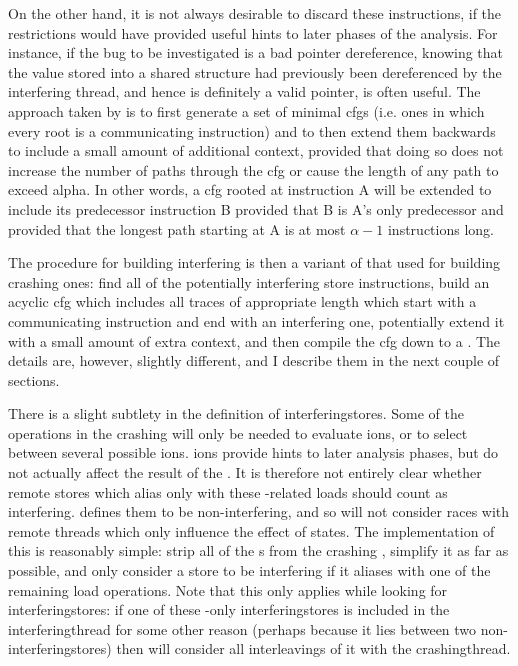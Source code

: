 On the other hand, it is not always desirable to discard these
instructions, if the restrictions would have provided useful hints to
later phases of the analysis.  For instance, if the bug to be
investigated is a bad pointer dereference, knowing that the value
stored into a shared structure had previously been dereferenced by the
interfering thread, and hence is definitely a valid pointer, is often
useful.  The approach taken by {\implementation} is to first generate
a set of minimal \glspl{cfg} (i.e. ones in which every root is a
communicating instruction) and to then extend them backwards to
include a small amount of additional context, provided that doing so
does not increase the number of paths through the \gls{cfg} or cause
the length of any path to exceed \gls{alpha}.  In other words, a
\gls{cfg} rooted at instruction A will be extended to include its
predecessor instruction B provided that B is A's only predecessor and
provided that the longest path starting at A is at most $\alpha - 1$
instructions long.

The procedure for building interfering {\StateMachines} is then a
variant of that used for building crashing ones: find all of the
potentially interfering store instructions, build an acyclic \gls{cfg} which
includes all traces of appropriate length which start with a
communicating instruction and end with an interfering one, potentially
extend it with a small amount of extra context, and then compile the
\gls{cfg} down to a {\StateMachine}.  The details are, however, slightly
different, and I describe them in the next couple of sections.

There is a slight subtlety in the definition of
\glspl{interferingstore}.  Some of the  operations in the
crashing {\StateMachine} will only be needed to evaluate
ions, or to select between several possible
ions.  ions provide hints to later
analysis phases, but do not actually affect the result of the
{\StateMachine}.  It is therefore not entirely clear whether remote
stores which alias only with these -related loads should
count as interfering.  {\Implementation} defines them to be
non-interfering, and so will not consider races with remote threads
which only influence the effect of  states.  The
implementation of this is reasonably simple: strip all of the
s from the crashing {\StateMachine}, simplify it as far
as possible, and only consider a store to be interfering if it aliases
with one of the remaining load operations.  Note that this only
applies while looking for \glspl{interferingstore}: if one of these
-only \glspl{interferingstore} is included in the
\gls{interferingthread} for some other reason (perhaps because it lies
between two non- \glspl{interferingstore}) then
{\implementation} will consider all interleavings of it with the
\gls{crashingthread}.

